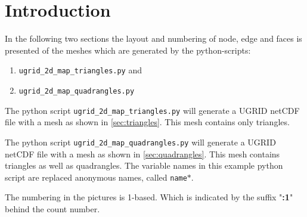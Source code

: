 \documentclass[biblatex]{deltares_memo}
\newcommand{\netcdf}{netCDF\xspace}
\newcommand{\ugrid}{UGRID\xspace}
\begin{document}
\memoConfidentialUntil{}
\memoDate{\today~\currenttime}
\memoCopy{}

\deltarestitle
\section{Introduction}

In the following two sections the layout and numbering of node, edge and faces is presented of the meshes which are generated by the python-scripts:
\begin{enumerate}
	\item \texttt{ugrid\_2d\_map\_triangles.py} and
	\item \texttt{ugrid\_2d\_map\_quadrangles.py}
\end{enumerate}

The python script \texttt{ugrid\_2d\_map\_triangles.py} will generate a \ugrid \netcdf file with a mesh as shown in \autoref{sec:triangles}.
This mesh contains only triangles.

The python script \texttt{ugrid\_2d\_map\_quadrangles.py} will generate a \ugrid \netcdf file with a mesh as shown in \autoref{sec:quadrangles}. 
This mesh contains triangles as well as quadrangles.
The variable names in this example python script are replaced anonymous names, called \texttt{name$\ast$}.

The numbering in the pictures is 1-based. Which is indicated by the suffix "\textbf{:1}" behind the count number.
\end{document}

